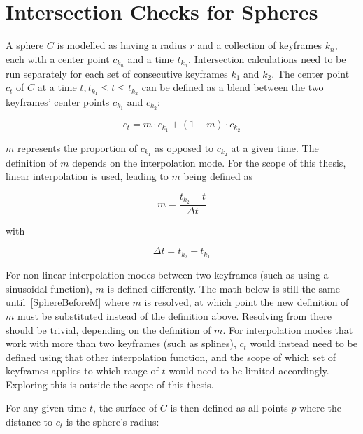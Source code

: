 \section{Intersection Checks for Spheres}

A sphere \(C\) is modelled as having a radius \(r\) and a collection of keyframes \(k_n\), each with a center point \(c_{k_n}\) and a time \(t_{k_n}\).
Intersection calculations need to be run separately for each set of consecutive keyframes \(k_1\) and \(k_2\).
\newline
The center point \(c_t\) of \(C\) at a time \(t, t_{k_1} \le t \le t_{k_2}\) can be defined
as a blend between the two keyframes' center points \(c_{k_1}\) and \(c_{k_2}\):

\begin{equation}
    c_t = m \cdot c_{k_1} + (1-m) \cdot c_{k_2}
\end{equation}

\(m\) represents the proportion of \(c_{k_1}\) as opposed to \(c_{k_2}\) at a given time.
The definition of \(m\) depends on the interpolation mode.
For the scope of this thesis, linear interpolation is used, leading to \(m\) being defined as

\begin{equation}\label{MDef}
    m = \frac{t_{k_2} - t}{\Delta t}
\end{equation}

with

\begin{equation}
    \Delta t = t_{k_2} - t_{k_1}
\end{equation}

For non-linear interpolation modes between two keyframes (such as using a sinusoidal function),
\(m\) is defined differently. The math below is still the same until~\eqref{SphereBeforeM} where \(m\) is resolved,
at which point the new definition of \(m\) must be substituted instead of the definition above.
Resolving from there should be trivial, depending on the definition of \(m\).
\newline
For interpolation modes that work with more than two keyframes (such as splines),
\(c_t\) would instead need to be defined using that other interpolation function,
and the scope of which set of keyframes applies to which range of \(t\) would need to be limited accordingly.
Exploring this is outside the scope of this thesis.
\newline

For any given time \(t\),
the surface of \(C\) is then defined as all points \(p\) where the distance to \(c_t\) is the sphere's radius:

